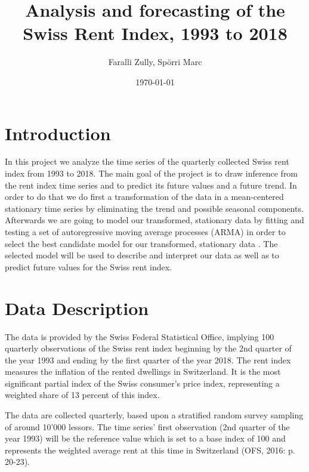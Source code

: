 \documentclass[11pt,a4paper]{article}
\title{Analysis and forecasting of the Swiss Rent Index, 1993 to 2018}
\author{Faralli Zully, Spörri Marc}
\date{\today}
\begin{document}
\maketitle
\newpage

\tableofcontents
\newpage



\section{Introduction}

In this project we analyze the time series of the quarterly collected Swiss rent index from 1993 to 2018.
The main goal of the project is to draw inference from the rent index time series and to predict its future values and a future trend.
In order to do that we do first a transformation of the data in a mean-centered stationary time series by eliminating the trend and possible seasonal components.
Afterwards we are going to model our transformed, stationary data by fitting and testing a set of autoregressive moving average processes (ARMA) in order to select the best candidate model for our transformed, stationary data \cite[p.~82--110]{bd02}.
The selected model will be used to describe and interpret our data as well as to predict future values for the Swiss rent index.



\section{Data Description}

The data is provided by the Swiss Federal Statistical Office, implying 100 quarterly observations of the Swiss rent index beginning by the 2nd quarter of the year 1993 and ending by the first quarter of the year 2018.
The rent index measures the inflation of the rented dwellings in Switzerland.
It is the most significant partial index of the Swiss consumer’s price index, representing a weighted share of 13 percent of this index.

The data are collected quarterly, based upon a stratified random survey sampling of around 10'000 lessors.
The time series' first observation (2nd quarter of the year 1993) will be the reference value which is set to a base index of 100 and represents the weighted average rent at this time in Switzerland (OFS, 2016: p. 20-23).
\end{document}
